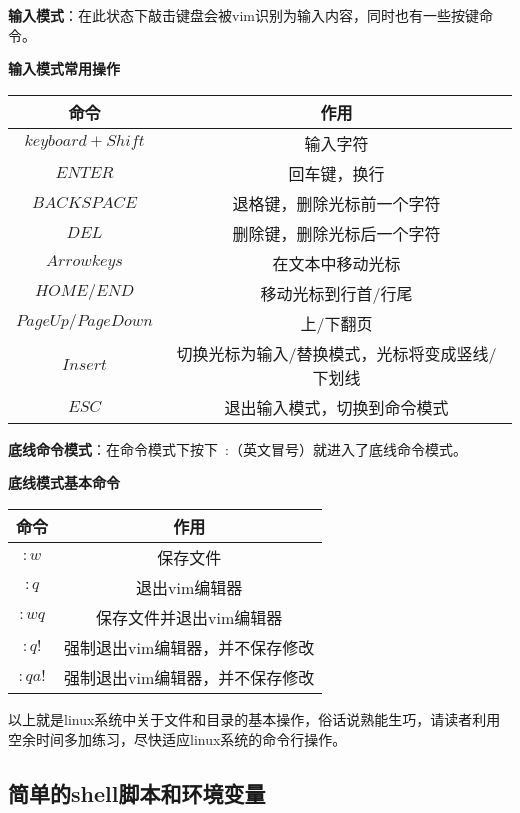 \textbf{输入模式}：在此状态下敲击键盘会被vim识别为输入内容，同时也有一些按键命令。

\begin{center}
\textbf{输入模式常用操作}

	\begin{tabular}{cc}
		\toprule[1.5pt]
		命令 & 作用\\
		\midrule[1pt]
		$  keyboard+Shift    $		&输入字符\\
		$  ENTER    $		&回车键，换行\\
		$  BACK SPACE    $		&退格键，删除光标前一个字符\\
		$  DEL    $		&删除键，删除光标后一个字符\\
		$  Arrow keys    $		&在文本中移动光标\\
		$  HOME/END    $		&移动光标到行首/行尾\\
		$  Page Up/Page Down    $		&上/下翻页\\
		$  Insert    $		&切换光标为输入/替换模式，光标将变成竖线/下划线\\
		$  ESC    $		&退出输入模式，切换到命令模式\\
		\bottomrule[1.5pt]
	\end{tabular}
\end{center}

\textbf{底线命令模式}：在命令模式下按下 :（英文冒号）就进入了底线命令模式。

\begin{center}
\textbf{底线模式基本命令}

	\begin{tabular}{cc}
		\toprule[1.5pt]
		命令 & 作用\\
		\midrule[1pt]
		$  :w    $		&保存文件\\
		$  :q    $		&退出vim编辑器\\
		$  :wq    $		&保存文件并退出vim编辑器\\
		$  :q!    $		&强制退出vim编辑器，并不保存修改\\
		$  :qa!    $		&强制退出vim编辑器，并不保存修改\\
		\bottomrule[1.5pt]
	\end{tabular}
\end{center}

以上就是linux系统中关于文件和目录的基本操作，俗话说熟能生巧，请读者利用空余时间多加练习，尽快适应linux系统的命令行操作。

\subsection{简单的shell脚本和环境变量}

